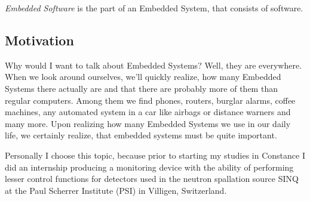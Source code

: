 \documentclass[10pt,a4paper,titlepage,draft]{article} %
\begin{document}
\emph{Embedded Software} is the part of an Embedded System, that consists of software.

\subsection{Motivation}
Why would I want to talk about Embedded Systems?
Well, they are everywhere. When we look around ourselves, we'll quickly realize, how many Embedded Systems there actually are and that there are probably more of them than regular computers.
Among them we find phones, routers, burglar alarms, coffee machines, any automated system in a car like airbags or distance warners and many more.
Upon realizing how many Embedded Systems we use in our daily life, we certainly realize, that embedded systems must be quite important.

Personally I choose this topic, because prior to starting my studies in Constance I did an internship producing a monitoring device with the ability of performing lesser control functions for detectors used in the neutron spallation source SINQ at the Paul Scherrer Institute (PSI) in Villigen, Switzerland.






\end{document}
